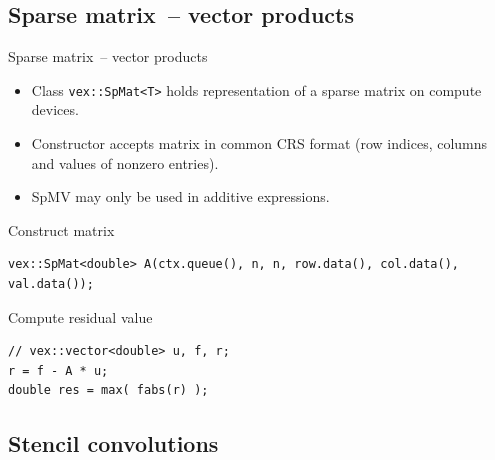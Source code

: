 \documentclass[@BEAMER_OPTIONS@]{beamer}
\newcommand{\code}[1]{\lstinline|#1|}
\begin{document}
\subsection{Sparse matrix~-- vector products}

\begin{frame}[fragile]{Sparse matrix~-- vector products}
    \begin{itemize}
        \item Class \code{vex::SpMat<T>} holds representation of a sparse
            matrix on compute devices.
        \item Constructor accepts matrix in common CRS format (row indices,
            columns and values of nonzero entries).
        \item SpMV may only be used in additive expressions.
    \end{itemize}
    \begin{exampleblock}{Construct matrix}
        \begin{lstlisting}
vex::SpMat<double> A(ctx.queue(), n, n, row.data(), col.data(), val.data());
        \end{lstlisting}
    \end{exampleblock}

    \begin{exampleblock}{Compute residual value}
        \begin{lstlisting}[firstnumber=last]
// vex::vector<double> u, f, r;
r = f - A * u;
double res = max( fabs(r) );
        \end{lstlisting}
    \end{exampleblock}
\end{frame}


\subsection{Stencil convolutions}
\end{document}
